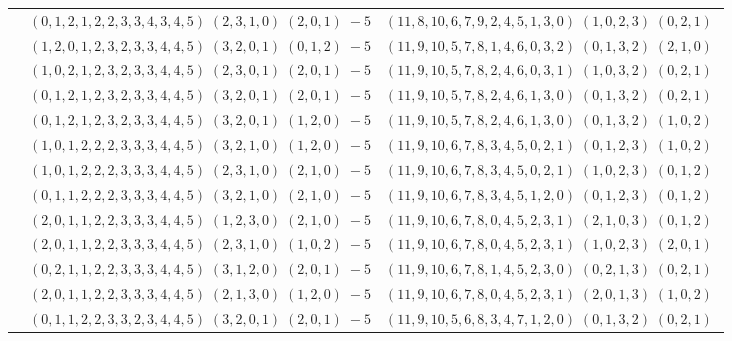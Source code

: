 \documentclass[11pt]{article}
\begin{document}
\begin{longtable}[l]{|c|c|c|}
 \cline{2-3} 
 & $(0 ,1 ,2 ,1 ,2 ,2 ,3 ,3 ,4 ,3 ,4 ,5) \;(2 ,3 ,1 ,0) \;(2 ,0 ,1) \;-5$ & $(11 ,8 ,10 ,6 ,7 ,9 ,2 ,4 ,5 ,1 ,3 ,0) \;(1 ,0 ,2 ,3) \;(0 ,2 ,1) \;$\\ 
 \cline{2-3} 
 & $(1 ,2 ,0 ,1 ,2 ,3 ,2 ,3 ,3 ,4 ,4 ,5) \;(3 ,2 ,0 ,1) \;(0 ,1 ,2) \;-5$ & $(11 ,9 ,10 ,5 ,7 ,8 ,1 ,4 ,6 ,0 ,3 ,2) \;(0 ,1 ,3 ,2) \;(2 ,1 ,0) \;$\\ 
 \cline{2-3} 
 & $(1 ,0 ,2 ,1 ,2 ,3 ,2 ,3 ,3 ,4 ,4 ,5) \;(2 ,3 ,0 ,1) \;(2 ,0 ,1) \;-5$ & $(11 ,9 ,10 ,5 ,7 ,8 ,2 ,4 ,6 ,0 ,3 ,1) \;(1 ,0 ,3 ,2) \;(0 ,2 ,1) \;$\\ 
 \cline{2-3} 
 & $(0 ,1 ,2 ,1 ,2 ,3 ,2 ,3 ,3 ,4 ,4 ,5) \;(3 ,2 ,0 ,1) \;(2 ,0 ,1) \;-5$ & $(11 ,9 ,10 ,5 ,7 ,8 ,2 ,4 ,6 ,1 ,3 ,0) \;(0 ,1 ,3 ,2) \;(0 ,2 ,1) \;$\\ 
 \cline{2-3} 
 & $(0 ,1 ,2 ,1 ,2 ,3 ,2 ,3 ,3 ,4 ,4 ,5) \;(3 ,2 ,0 ,1) \;(1 ,2 ,0) \;-5$ & $(11 ,9 ,10 ,5 ,7 ,8 ,2 ,4 ,6 ,1 ,3 ,0) \;(0 ,1 ,3 ,2) \;(1 ,0 ,2) \;$\\ 
 \cline{2-3} 
 & $(1 ,0 ,1 ,2 ,2 ,2 ,3 ,3 ,3 ,4 ,4 ,5) \;(3 ,2 ,1 ,0) \;(1 ,2 ,0) \;-5$ & $(11 ,9 ,10 ,6 ,7 ,8 ,3 ,4 ,5 ,0 ,2 ,1) \;(0 ,1 ,2 ,3) \;(1 ,0 ,2) \;$\\ 
 \cline{2-3} 
 & $(1 ,0 ,1 ,2 ,2 ,2 ,3 ,3 ,3 ,4 ,4 ,5) \;(2 ,3 ,1 ,0) \;(2 ,1 ,0) \;-5$ & $(11 ,9 ,10 ,6 ,7 ,8 ,3 ,4 ,5 ,0 ,2 ,1) \;(1 ,0 ,2 ,3) \;(0 ,1 ,2) \;$\\ 
 \cline{2-3} 
 & $(0 ,1 ,1 ,2 ,2 ,2 ,3 ,3 ,3 ,4 ,4 ,5) \;(3 ,2 ,1 ,0) \;(2 ,1 ,0) \;-5$ & $(11 ,9 ,10 ,6 ,7 ,8 ,3 ,4 ,5 ,1 ,2 ,0) \;(0 ,1 ,2 ,3) \;(0 ,1 ,2) \;$\\ 
 \cline{2-3} 
 & $(2 ,0 ,1 ,1 ,2 ,2 ,3 ,3 ,3 ,4 ,4 ,5) \;(1 ,2 ,3 ,0) \;(2 ,1 ,0) \;-5$ & $(11 ,9 ,10 ,6 ,7 ,8 ,0 ,4 ,5 ,2 ,3 ,1) \;(2 ,1 ,0 ,3) \;(0 ,1 ,2) \;$\\ 
 \cline{2-3} 
 & $(2 ,0 ,1 ,1 ,2 ,2 ,3 ,3 ,3 ,4 ,4 ,5) \;(2 ,3 ,1 ,0) \;(1 ,0 ,2) \;-5$ & $(11 ,9 ,10 ,6 ,7 ,8 ,0 ,4 ,5 ,2 ,3 ,1) \;(1 ,0 ,2 ,3) \;(2 ,0 ,1) \;$\\ 
 \cline{2-3} 
 & $(0 ,2 ,1 ,1 ,2 ,2 ,3 ,3 ,3 ,4 ,4 ,5) \;(3 ,1 ,2 ,0) \;(2 ,0 ,1) \;-5$ & $(11 ,9 ,10 ,6 ,7 ,8 ,1 ,4 ,5 ,2 ,3 ,0) \;(0 ,2 ,1 ,3) \;(0 ,2 ,1) \;$\\ 
 \cline{2-3} 
 & $(2 ,0 ,1 ,1 ,2 ,2 ,3 ,3 ,3 ,4 ,4 ,5) \;(2 ,1 ,3 ,0) \;(1 ,2 ,0) \;-5$ & $(11 ,9 ,10 ,6 ,7 ,8 ,0 ,4 ,5 ,2 ,3 ,1) \;(2 ,0 ,1 ,3) \;(1 ,0 ,2) \;$\\ 
 \cline{2-3} 
 & $(0 ,1 ,1 ,2 ,2 ,3 ,3 ,2 ,3 ,4 ,4 ,5) \;(3 ,2 ,0 ,1) \;(2 ,0 ,1) \;-5$ & $(11 ,9 ,10 ,5 ,6 ,8 ,3 ,4 ,7 ,1 ,2 ,0) \;(0 ,1 ,3 ,2) \;(0 ,2 ,1) \;$\\ 

\end{longtable}
\end{document}

